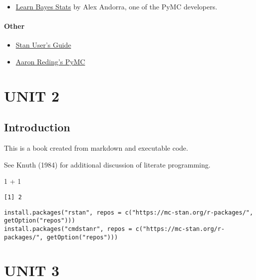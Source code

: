 \documentclass[
  letterpaper,
  DIV=11,
  numbers=noendperiod]{scrreprt}
\newenvironment{Shaded}{\begin{snugshade}}{\end{snugshade}}
\newcommand{\DecValTok}[1]{\textcolor[rgb]{0.68,0.00,0.00}{#1}}
\newcommand{\SpecialCharTok}[1]{\textcolor[rgb]{0.37,0.37,0.37}{#1}}
\providecommand{\tightlist}{%
  \setlength{\itemsep}{0pt}\setlength{\parskip}{0pt}}\usepackage{longtable,booktabs,array}
\begin{document}
\begin{itemize}
\tightlist
\item
  \href{https://learnbayesstats.com/}{Learn Bayes Stats} by Alex
  Andorra, one of the PyMC developers.
\end{itemize}

\hypertarget{other}{%
\subsection*{Other}\label{other}}

\begin{itemize}
\tightlist
\item
  \href{https://mc-stan.org/docs/2_31/stan-users-guide/index.html}{Stan
  User's Guide}
\item
  \href{https://areding.github.io/6420-pymc/intro.html}{Aaron Reding's
  PyMC}
\end{itemize}

\part{UNIT 2}

\hypertarget{introduction}{%
\chapter{Introduction}\label{introduction}}

This is a book created from markdown and executable code.

See Knuth (1984) for additional discussion of literate programming.

\begin{Shaded}
\begin{Highlighting}[]
\DecValTok{1} \SpecialCharTok{+} \DecValTok{1}
\end{Highlighting}
\end{Shaded}

\begin{verbatim}
[1] 2
\end{verbatim}

\begin{verbatim}
install.packages("rstan", repos = c("https://mc-stan.org/r-packages/", getOption("repos")))
install.packages("cmdstanr", repos = c("https://mc-stan.org/r-packages/", getOption("repos")))
\end{verbatim}

\part{UNIT 3}
\end{document}
